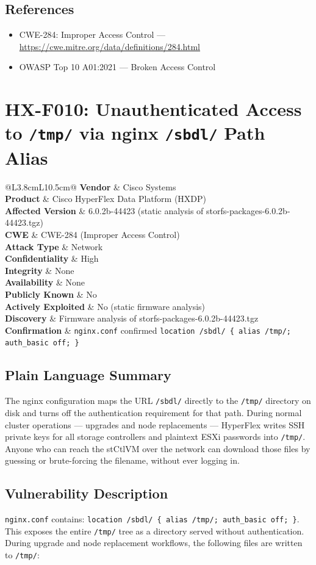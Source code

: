 \documentclass[11pt,a4paper]{article}
\makeatletter
\newcommand{\findingmeta}[9]{%
\begin{tabular}{@{}L{3.8cm}L{10.5cm}@{}}
\textbf{Vendor}             & Cisco Systems \\
\textbf{Product}            & Cisco HyperFlex Data Platform (HXDP) \\
\textbf{Affected Version}   & 6.0.2b-44423 (static analysis of storfs-packages-6.0.2b-44423.tgz) \\
\textbf{CWE}                & #1 \\
\textbf{Attack Type}        & #2 \\
\textbf{Confidentiality}    & #3 \\
\textbf{Integrity}          & #4 \\
\textbf{Availability}       & #5 \\
\textbf{Publicly Known}     & #6 \\
\textbf{Actively Exploited} & #7 \\
\textbf{Discovery}          & #8 \\
\textbf{Confirmation}       & #9 \\
\end{tabular}%
}
\makeatother
\begin{document}
\subsection*{References}

\begin{itemize}[noitemsep]
\item CWE-284: Improper Access Control ---
  \url{https://cwe.mitre.org/data/definitions/284.html}
\item OWASP Top 10 A01:2021 --- Broken Access Control
\end{itemize}

\bigskip

\section{HX-F010: Unauthenticated Access to \texttt{/tmp/} via nginx \texttt{/sbdl/} Path Alias}

\findingmeta{CWE-284 (Improper Access Control)}{Network}{High}{None}{None}{No}{No (static firmware analysis)}{Firmware analysis of storfs-packages-6.0.2b-44423.tgz}{\texttt{nginx.conf} confirmed \texttt{location /sbdl/ \{ alias /tmp/; auth\_basic off; \}}}

\subsection*{Plain Language Summary}

The nginx configuration maps the URL \texttt{/sbdl/} directly to the
\texttt{/tmp/} directory on disk and turns off the authentication requirement
for that path. During normal cluster operations --- upgrades and node
replacements --- HyperFlex writes SSH private keys for all storage controllers
and plaintext ESXi passwords into \texttt{/tmp/}. Anyone who can reach the
stCtlVM over the network can download those files by guessing or brute-forcing
the filename, without ever logging in.

\subsection*{Vulnerability Description}

\texttt{nginx.conf} contains: \texttt{location /sbdl/ \{ alias /tmp/;
auth\_basic off; \}}. This exposes the entire \texttt{/tmp/} tree as a
directory served without authentication. During upgrade and node replacement
workflows, the following files are written to \texttt{/tmp/}:
\end{document}
